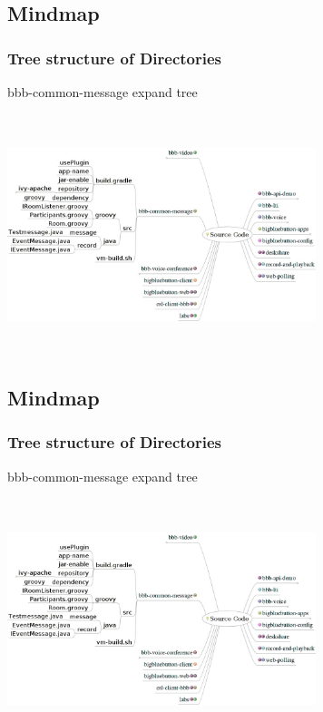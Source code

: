 \documentclass{beamer}
\begin{document}
\subsection*{Mindmap}
\begin{frame}
\frametitle{Tree structure of Directories}
{bbb-common-message expand tree }

\includegraphics[height=70mm,width=90mm]{./images/SourceCode2.jpeg}
\end{frame}



\subsection*{Mindmap}
\begin{frame}
\frametitle{Tree structure of Directories}
{bbb-common-message expand tree }

\includegraphics[height=70mm,width=90mm]{./images/SourceCode2.jpeg}
\end{frame}
\end{document}
